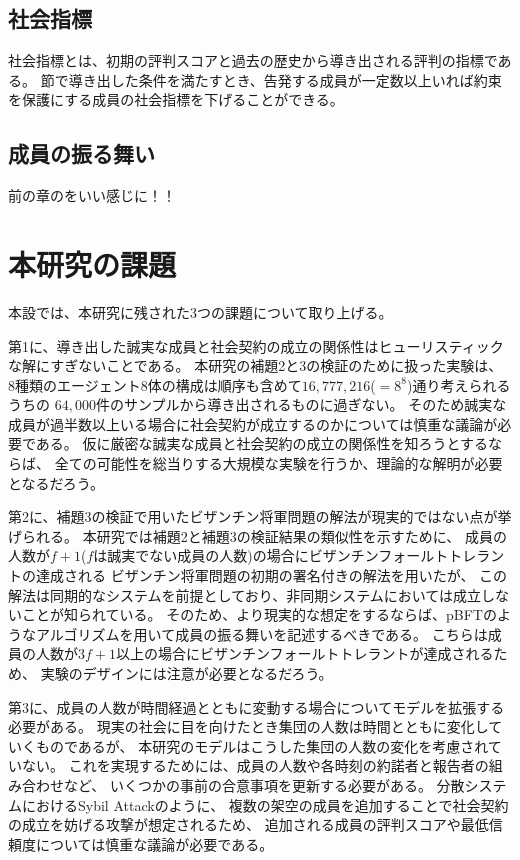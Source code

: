 \subsection{社会指標}
社会指標とは、初期の評判スコアと過去の歴史から導き出される評判の指標である。
節で導き出した条件を満たすとき、告発する成員が一定数以上いれば約束を保護にする成員の社会指標を下げることができる。

\subsection{成員の振る舞い}
前の章のをいい感じに！！

\section{本研究の課題}
本設では、本研究に残された3つの課題について取り上げる。

第1に、導き出した誠実な成員と社会契約の成立の関係性はヒューリスティックな解にすぎないことである。
本研究の補題2と3の検証のために扱った実験は、
8種類のエージェント8体の構成は順序も含めて$16,777,216$($=8^8$)通り考えられるうちの
$64,000$件のサンプルから導き出されるものに過ぎない。
そのため誠実な成員が過半数以上いる場合に社会契約が成立するのかについては慎重な議論が必要である。
仮に厳密な誠実な成員と社会契約の成立の関係性を知ろうとするならば、
全ての可能性を総当りする大規模な実験を行うか、理論的な解明が必要となるだろう。

第2に、補題3の検証で用いたビザンチン将軍問題の解法が現実的ではない点が挙げられる。
本研究では補題2と補題3の検証結果の類似性を示すために、
成員の人数が$f+1$($f$は誠実でない成員の人数)の場合にビザンチンフォールトトレラントの達成される
ビザンチン将軍問題の初期の署名付きの解法\cite{lamport1982}を用いたが、
この解法は同期的なシステムを前提としており、非同期システムにおいては成立しないことが知られている。\cite{fischer1985}
そのため、より現実的な想定をするならば、pBFTのようなアルゴリズムを用いて成員の振る舞いを記述するべきである。\cite{castro1999}
こちらは成員の人数が$3f+1$以上の場合にビザンチンフォールトトレラントが達成されるため、
実験のデザインには注意が必要となるだろう。

第3に、成員の人数が時間経過とともに変動する場合についてモデルを拡張する必要がある。
現実の社会に目を向けたとき集団の人数は時間とともに変化していくものであるが、
本研究のモデルはこうした集団の人数の変化を考慮されていない。
これを実現するためには、成員の人数や各時刻の約諾者と報告者の組み合わせなど、
いくつかの事前の合意事項を更新する必要がある。
分散システムにおけるSybil Attack\cite{douceur2002}のように、
複数の架空の成員を追加することで社会契約の成立を妨げる攻撃が想定されるため、
追加される成員の評判スコアや最低信頼度については慎重な議論が必要である。

